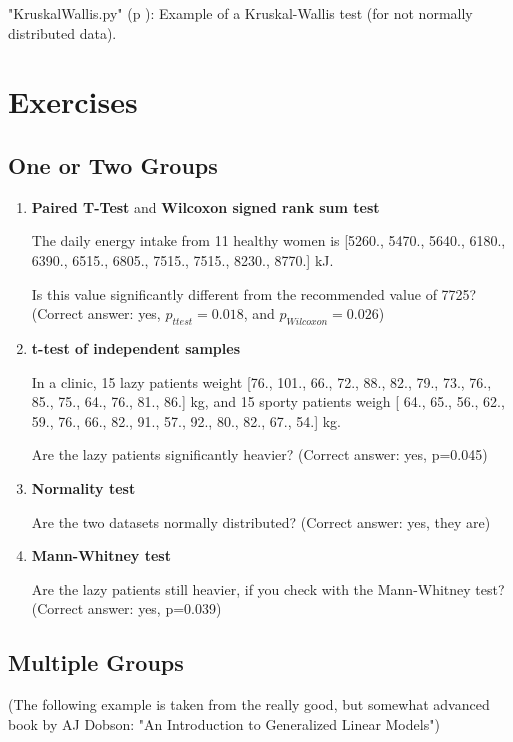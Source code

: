 \PyImg "KruskalWallis.py" (p \pageref{py:KruskalWallis}): Example of a Kruskal-Wallis test (for not normally distributed data).

\section{Exercises}

\subsection*{One or Two Groups}

\begin{enumerate}
  \item \textbf{Paired T-Test} and \textbf{Wilcoxon signed rank sum test}

The daily energy intake from 11 healthy women is [5260., 5470., 5640., 6180., 6390., 6515., 6805., 7515., 7515., 8230., 8770.] kJ.

    Is this value significantly different from the recommended value of 7725?
    (Correct answer: yes, $p_{ttest}=0.018$, and $p_{Wilcoxon}=0.026$)

  \item \textbf{t-test of independent samples}

In a clinic, 15 lazy patients weight [76., 101., 66., 72., 88., 82., 79., 73., 76., 85., 75., 64., 76., 81., 86.] kg, and 15 sporty patients weigh [ 64., 65., 56., 62., 59., 76., 66., 82., 91., 57., 92., 80., 82., 67., 54.] kg.

    Are the lazy patients significantly heavier?
    (Correct answer: yes, p=0.045)

  \item \textbf{Normality test}

    Are the two datasets normally distributed?
    (Correct answer: yes, they are)

  \item \textbf{Mann-Whitney test}

    Are the lazy patients still heavier, if you check with the Mann-Whitney test?
    (Correct answer: yes, p=0.039)
\end{enumerate}

\subsection*{Multiple Groups}

(The following example is taken from the really good, but somewhat advanced book by AJ Dobson: "An Introduction to Generalized Linear Models")

